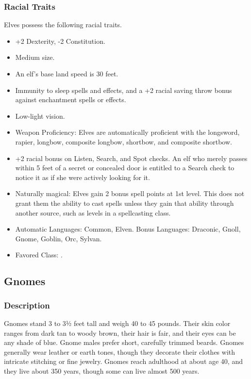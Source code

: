 \subsubsection{Racial Traits}
Elves possess the following racial traits.

\begin{itemize}
 \item +2 Dexterity, -2 Constitution.
 \item Medium size.
 \item An elf's base land speed is 30 feet.
 \item Immunity to sleep spells and effects, and a +2 racial saving throw bonus against enchantment spells or effects.
 \item Low-light vision.
 \item Weapon Proficiency: Elves are automatically proficient with the longsword, rapier, longbow, composite longbow, shortbow, and composite shortbow.
 \item +2 racial bonus on Listen, Search, and Spot checks. An elf who merely passes within 5 feet of a secret or concealed door is entitled to a Search check to notice it as if she were actively looking for it.
 \item Naturally magical: Elves gain 2 bonus spell points at 1st level. This does not grant them the ability to cast spells unless they gain that ability through another source, such as levels in a spellcasting class.
 \item Automatic Languages: Common, Elven. Bonus Languages: Draconic, Gnoll, Gnome, Goblin, Orc, Sylvan.
 \item Favored Class: .
\end{itemize}
\subsection{Gnomes}
\subsubsection{Description}
Gnomes stand 3 to 3½ feet tall and weigh 40 to 45 pounds. Their skin color ranges from dark tan to woody brown, their hair is fair, and their eyes can be any shade of blue. Gnome males prefer short, carefully trimmed beards. Gnomes generally wear leather or earth tones, though they decorate their clothes with intricate stitching or fine jewelry. Gnomes reach adulthood at about age 40, and they live about 350 years, though some can live almost 500 years.

